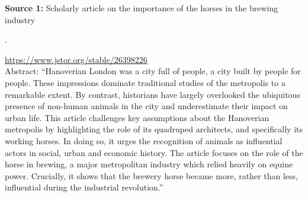 \textbf{Source 1:} Scholarly article on the importance of the horses in the brewing industry 

\cite{almer13}.

\url{https://www.jstor.org/stable/26398226} \\

Abstract: ``Hanoverian London was a city full of people, a city built by people for people. These impressions dominate traditional studies of the metropolis to a remarkable extent. By contrast, historians have largely overlooked the ubiquitous presence of non-human animals in the city and underestimate their impact on urban life. This article challenges key assumptions about the Hanoverian metropolis by highlighting the role of its quadruped architects, and specifically its working horses. In doing so, it urges the recognition of animals as influential actors in social, urban and economic history. The article focuses on the role of the horse in brewing, a major metropolitan industry which relied heavily on equine power. Crucially, it shows that the brewery horse became more, rather than less, influential during the industrial revolution.'' \\